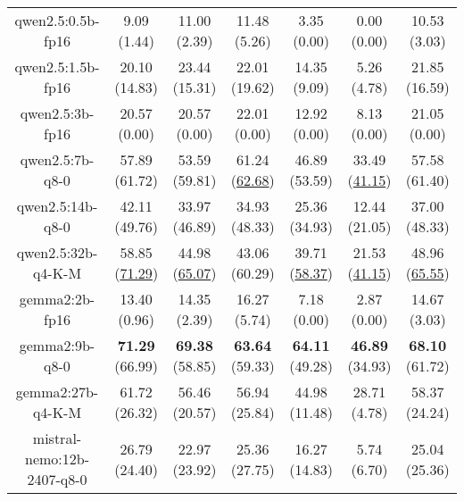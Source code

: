 \begin{table}[hbp]
{\begin{tabular}{ccccccc}
      \multicolumn{1}{c|}{qwen2.5:0.5b-fp16} & 9.09 (1.44) & 11.00 (2.39) & \multicolumn{1}{c|}{11.48 (5.26)} & 3.35 (0.00) & \multicolumn{1}{c|}{0.00 (0.00)} & 10.53 (3.03) \\

      \multicolumn{1}{c|}{qwen2.5:1.5b-fp16} & 20.10 (14.83) & 23.44 (15.31) & \multicolumn{1}{c|}{22.01 (19.62)} & 14.35 (9.09) & \multicolumn{1}{c|}{5.26 (4.78)} & 21.85 (16.59) \\

      \multicolumn{1}{c|}{qwen2.5:3b-fp16} & 20.57 (0.00) & 20.57 (0.00) & \multicolumn{1}{c|}{22.01 (0.00)} & 12.92 (0.00) & \multicolumn{1}{c|}{8.13 (0.00)} & 21.05 (0.00) \\

      \multicolumn{1}{c|}{qwen2.5:7b-q8-0} & 57.89 (61.72) & 53.59 (59.81) & \multicolumn{1}{c|}{61.24 (\underline{62.68})} & 46.89 (53.59) & \multicolumn{1}{c|}{33.49 (\underline{41.15})} & 57.58 (61.40) \\

      \multicolumn{1}{c|}{qwen2.5:14b-q8-0} & 42.11 (49.76) & 33.97 (46.89) & \multicolumn{1}{c|}{34.93 (48.33)} & 25.36 (34.93) & \multicolumn{1}{c|}{12.44 (21.05)} & 37.00 (48.33) \\

      \multicolumn{1}{c|}{qwen2.5:32b-q4-K-M} & 58.85 (\underline{71.29}) & 44.98 (\underline{65.07}) & \multicolumn{1}{c|}{43.06 (60.29)} & 39.71 (\underline{58.37}) & \multicolumn{1}{c|}{21.53 (\underline{41.15})} & 48.96 (\underline{65.55}) \\

      \multicolumn{1}{c|}{gemma2:2b-fp16} & 13.40 (0.96) & 14.35 (2.39) & \multicolumn{1}{c|}{16.27 (5.74)} & 7.18 (0.00) & \multicolumn{1}{c|}{2.87 (0.00)} & 14.67 (3.03) \\

      \multicolumn{1}{c|}{gemma2:9b-q8-0} & \textbf{71.29} (66.99) & \textbf{69.38} (58.85) & \multicolumn{1}{c|}{\textbf{63.64} (59.33)} & \textbf{64.11} (49.28) & \multicolumn{1}{c|}{\textbf{46.89} (34.93)} & \textbf{68.10} (61.72) \\

      \multicolumn{1}{c|}{gemma2:27b-q4-K-M} & 61.72 (26.32) & 56.46 (20.57) & \multicolumn{1}{c|}{56.94 (25.84)} & 44.98 (11.48) & \multicolumn{1}{c|}{28.71 (4.78)} & 58.37 (24.24) \\

      \multicolumn{1}{c|}{mistral-nemo:12b-2407-q8-0} & 26.79 (24.40) & 22.97 (23.92) & \multicolumn{1}{c|}{25.36 (27.75)} & 16.27 (14.83) & \multicolumn{1}{c|}{5.74 (6.70)} & 25.04 (25.36) \\


\end{tabular}}
\end{table}
